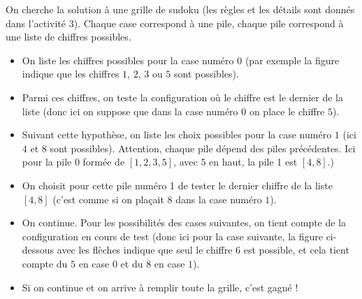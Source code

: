 \documentclass[11pt,class=report,crop=false]{standalone}
\begin{document}






\begin{cours}


On cherche la solution à une grille de sudoku (les règles et les détails sont donnés dans l'activité 3). Chaque case correspond à une pile, chaque pile correspond à une liste de chiffres possibles. 


\begin{itemize}
  \item On liste les chiffres possibles pour la case numéro $0$ (par exemple la figure indique que les chiffres $1$, $2$, $3$ ou $5$ sont possibles).
  \item Parmi ces chiffres, on teste la configuration où le chiffre est le dernier de la liste (donc ici on suppose que dans la case numéro $0$ on place le chiffre $5$).
  \item Suivant cette hypothèse, on liste les choix possibles pour la case numéro $1$ (ici $4$ et $8$ sont possibles). Attention, chaque pile dépend des piles précédentes. Ici pour la pile $0$ formée de $[1,2,3,5]$, avec $5$ en haut, la pile 1 est $[4,8]$.)
  \item On choisit pour cette pile numéro 1 de tester le dernier chiffre de la liste $[4,8]$ (c'est comme si on plaçait $8$ dans la case numéro $1$).
  \item On continue. Pour les possibilités des cases suivantes, on tient compte de la configuration en cours de test (donc ici pour la case suivante, la figure ci-dessous avec les flèches indique que seul le chiffre $6$ est possible, et cela tient compte du $5$ en case $0$ et du $8$ en case $1$).
    \item Si on continue et on arrive à remplir toute la grille, c'est gagné !
    

\end{itemize}
\end{cours}
\end{document}
